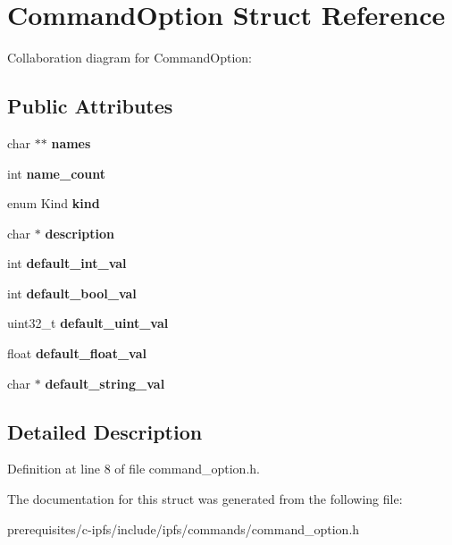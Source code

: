 \hypertarget{struct_command_option}{}\section{Command\+Option Struct Reference}
\label{struct_command_option}


Collaboration diagram for Command\+Option\+:
\subsection*{Public Attributes}
\begin{DoxyCompactItemize}
\item 
\mbox{\label{struct_command_option_a3a063ad9d5e03f3bcf2ed1d03ec5889f}} 
char $\ast$$\ast$ {\bfseries names}
\item 
\mbox{\label{struct_command_option_ac54430b2160a2f89d20a274f85744bd3}} 
int {\bfseries name\+\_\+count}
\item 
\mbox{\label{struct_command_option_a2c360ed3f447dadf89b98bec1f6953b0}} 
enum Kind {\bfseries kind}
\item 
\mbox{\label{struct_command_option_a699c2bd836fc622d6d5712f020d93711}} 
char $\ast$ {\bfseries description}
\item 
\mbox{\label{struct_command_option_a1acc813f6484bdb8d65297a53b2ee1a6}} 
int {\bfseries default\+\_\+int\+\_\+val}
\item 
\mbox{\label{struct_command_option_ab81a808e7644a4fe7f0dbb4557b12bfe}} 
int {\bfseries default\+\_\+bool\+\_\+val}
\item 
\mbox{\label{struct_command_option_a7d8e6ce46c7e9e62f5ec45f12d49f219}} 
uint32\+\_\+t {\bfseries default\+\_\+uint\+\_\+val}
\item 
\mbox{\label{struct_command_option_a7902f420978eb46114be8537373a5efb}} 
float {\bfseries default\+\_\+float\+\_\+val}
\item 
\mbox{\label{struct_command_option_a34f090e81e11b422415a042c589a1652}} 
char $\ast$ {\bfseries default\+\_\+string\+\_\+val}
\end{DoxyCompactItemize}


\subsection{Detailed Description}


Definition at line 8 of file command\+\_\+option.\+h.



The documentation for this struct was generated from the following file\+:\begin{DoxyCompactItemize}
\item 
prerequisites/c-\/ipfs/include/ipfs/commands/command\+\_\+option.\+h\end{DoxyCompactItemize}
